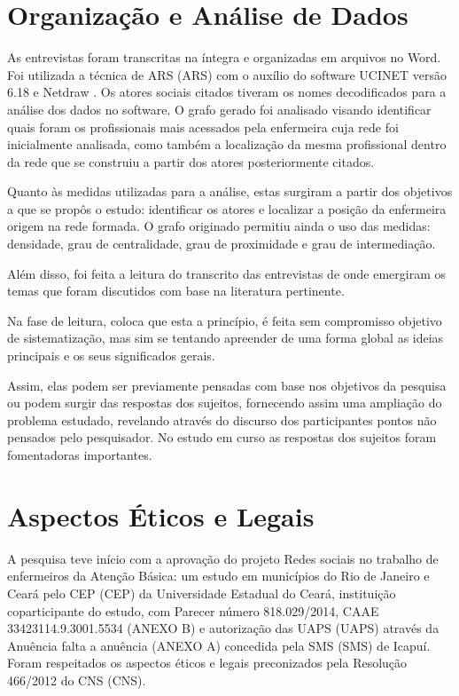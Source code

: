 \section{Organização e Análise de Dados}
As entrevistas foram transcritas na íntegra e organizadas em arquivos no Word. Foi utilizada a técnica de \acrlong{ARS} (\acrshort{ARS}) com o auxílio do software UCINET versão 6.18 e Netdraw \cite{ucinet}. Os atores sociais citados tiveram os nomes decodificados para a análise dos dados no software. O grafo gerado foi analisado visando identificar quais foram os profissionais mais acessados pela enfermeira cuja rede foi inicialmente analisada, como também a localização da mesma profissional dentro da rede que se construiu a partir dos atores posteriormente citados.

Quanto às medidas utilizadas para a análise, estas surgiram a partir dos objetivos a que se propôs o estudo: identificar os atores e localizar a posição da enfermeira origem na rede formada. O grafo originado permitiu ainda o uso das medidas: densidade, 
grau de centralidade, grau de proximidade e grau de intermediação.

Além disso, foi feita a leitura do transcrito das entrevistas de onde emergiram os temas que foram discutidos com base na literatura pertinente. 

Na fase de leitura, \cite{campos2004metodo} coloca que esta a princípio, é feita sem compromisso objetivo de  sistematização, mas sim se tentando apreender de uma forma global as ideias principais e os seus significados gerais.  

Assim, elas podem ser previamente pensadas com base nos objetivos da pesquisa ou podem  surgir das respostas dos sujeitos, fornecendo assim uma ampliação do problema estudado, revelando através do discurso dos participantes pontos não pensados pelo pesquisador. No estudo em curso as respostas dos sujeitos foram fomentadoras importantes.

\section{Aspectos Éticos e Legais}
A pesquisa teve início com a aprovação do projeto Redes sociais no trabalho de enfermeiros da Atenção Básica: um estudo em municípios do Rio de Janeiro e Ceará pelo \acrlong{CEP} (\acrshort{CEP}) da Universidade Estadual do Ceará, instituição coparticipante do estudo, com Parecer número 818.029/2014, CAAE 33423114.9.3001.5534 (ANEXO B) e autorização das \acrlong{UAPS} (\acrshort{UAPS}) através da Anuência falta a anuência (ANEXO A) concedida pela \acrlong{SMS} (\acrshort{SMS}) de Icapuí. Foram respeitados os aspectos éticos e legais preconizados pela Resolução 466/2012 do \acrlong{CNS} (\acrshort{CNS}). 

